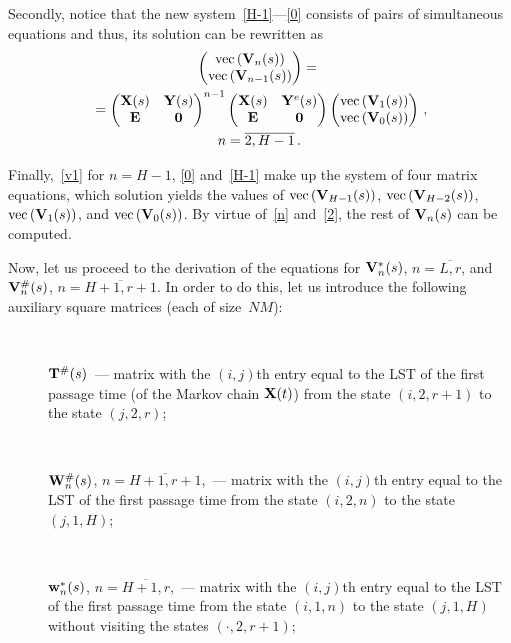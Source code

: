 \begin{multicols}{2}
\noindent Secondly, notice that the new system~\eqref{H-1}---\eqref{0}
 consists of pairs of simultaneous equations and thus, its solution can 
 be rewritten as
\begin{multline}
\label{v1}
\begin{pmatrix}
    \mathrm{vec}\left(\mathbf{V}_{n}(s)\right) \\
    \mathrm{vec}\left(\mathbf{V}_{n-1}(s)\right) 
\end{pmatrix}
={}\\
{}=
\begin{pmatrix}
    \mathbf{X}(s) & \mathbf{Y}(s) \\
    \mathbf{E} & \mathbf{0}
\end{pmatrix}^{n-1}
\begin{pmatrix}
    \mathbf{X}(s) & \mathbf{Y}^e(s) \\
    \mathbf{E} & \mathbf{0}
\end{pmatrix}
\begin{pmatrix}
    \mathrm{vec}\left(\mathbf{V}_{1}(s)\right) \\
    \mathrm{vec}\left(\mathbf{V}_{0}(s)\right)
\end{pmatrix}\,, \\
 n=\overline{2,H-1}\,.
\end{multline}


\noindent 
Finally,~\eqref{v1} for $n=H-1$, \eqref{0} and~\eqref{H-1}
make up the system of four matrix equations,
which solution yields the values of 
$\mathrm{vec}\,(\mathbf{V}_{H-1}(s))$, $\mathrm{vec}\,(\mathbf{V}_{H-2}(s))$,
$\mathrm{vec}\,(\mathbf{V}_{1}(s))$, and $\mathrm{vec}\,(\mathbf{V}_{0}(s))$.
By virtue of~\eqref{n} and~\eqref{2}, the rest 
of $\mathbf{V}_{n}(s)$ can be computed.

Now, let us proceed to the derivation of the equations for 
$\mathbf{V}^*_{n}(s)$, $n=\overline{L,r}$,
and $\mathbf{V}^{\#}_{n}(s)$, $n=\overline{H+1,r+1}$.
In order to do this, let us introduce the following auxiliary 
square matrices (each of size~$NM$):
\begin{description}
\item[\,] $\mathbf{T}^{\#}(s)$~---  
matrix with the  $(i,j)${th} entry 
equal to the LST of the first passage time (of the Markov chain ${\bf{X}}(t)$)
from the state $(i,2,r+1)$ to the state $(j,2,r)$;
\item[\,] 
$\mathbf{W}^{\#}_n(s)$, $n=\overline{H+1,r+1}$,~---
matrix with the $(i,j)${th} entry 
equal to the LST of the first passage time 
from the state $(i,2,n)$ to the state $(j,1,H)$;

\item[\,] 
$\mathbf{w}^*_n(s)$, $n=\overline{H+1,r}$,~---
matrix with the $(i,j)${th} entry 
equal to the LST of the first passage time 
from the state $(i,1,n)$ to the state $(j,1,H)$
without visiting the states $(\cdot,2,r+1)$;


\end{description}
\end{multicols}
